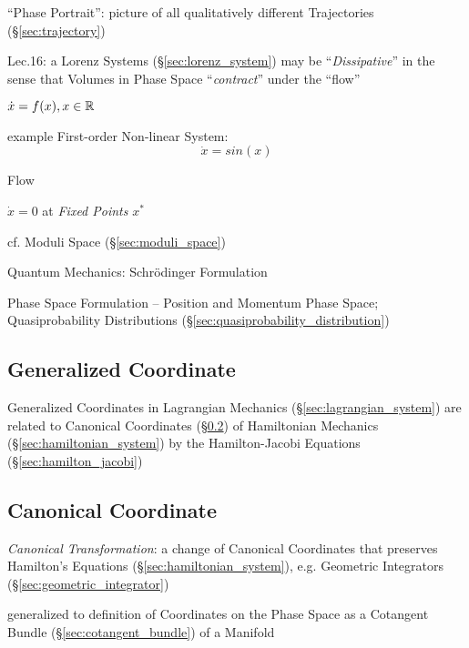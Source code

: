 ``Phase Portrait'': picture of all qualitatively different Trajectories
(\S\ref{sec:trajectory})

Lec.16: a Lorenz Systems (\S\ref{sec:lorenz_system}) may be
``\emph{Dissipative}'' in the sense that Volumes in Phase Space
``\emph{contract}'' under the ``flow''

$\dot{x} = f(x), x \in \mathbb{R}$

example First-order Non-linear System:
\[
  \dot{x} = sin(x)
\]

Flow

$\dot{x} = 0$ at \emph{Fixed Points} $x^*$

cf. Moduli Space (\S\ref{sec:moduli_space})


\asterism


Quantum Mechanics: Schr\"odinger Formulation

Phase Space Formulation -- Position and Momentum Phase Space; Quasiprobability
Distributions (\S\ref{sec:quasiprobability_distribution})



\subsection{Generalized Coordinate}\label{sec:generalized_coordinate}

Generalized Coordinates in Lagrangian Mechanics (\S\ref{sec:lagrangian_system})
are related to Canonical Coordinates (\S\ref{sec:canonical_coordinate}) of
Hamiltonian Mechanics (\S\ref{sec:hamiltonian_system}) by the Hamilton-Jacobi
Equations (\S\ref{sec:hamilton_jacobi})



\subsection{Canonical Coordinate}\label{sec:canonical_coordinate}

\emph{Canonical Transformation}: a change of Canonical Coordinates that
preserves Hamilton's Equations (\S\ref{sec:hamiltonian_system}), e.g. Geometric
Integrators (\S\ref{sec:geometric_integrator})

generalized to definition of Coordinates on the Phase Space as a Cotangent
Bundle (\S\ref{sec:cotangent_bundle}) of a Manifold

